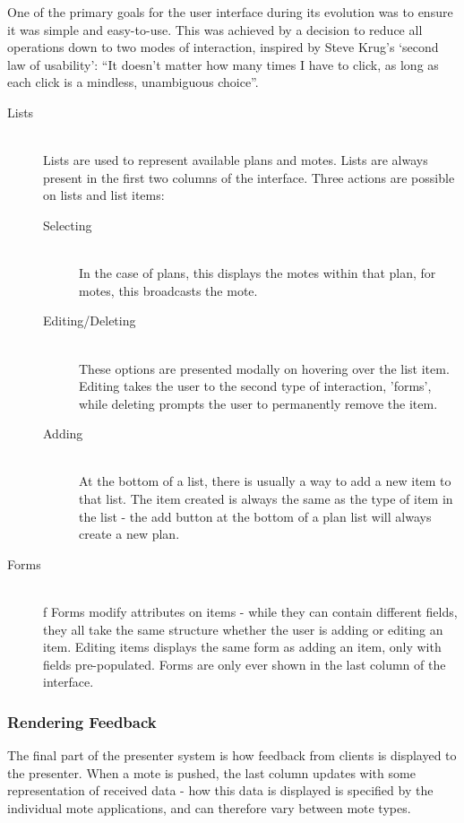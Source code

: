 \documentclass[a4papert,11pt,notitlepage]{article}
\begin{document}
One of the primary goals for the user interface during its evolution was to ensure it was simple and easy-to-use. This was achieved by a decision to reduce all operations down to two modes of interaction, inspired by Steve Krug's `second law of usability': ``It doesn't matter how many times I have to click, as long as each click is a mindless, unambiguous choice''\cite{krug:dontmakemethink}.
\begin{description}
\item[Lists] \hfill \\
Lists are used to represent available plans and motes. Lists are always present in the first two columns of the interface. Three actions are possible on lists and list items:
\begin{description}
\item[Selecting] \hfill \\
In the case of plans, this displays the motes within that plan, for motes, this broadcasts the mote.
\item[Editing/Deleting] \hfill \\
These options are presented modally on hovering over the list item. Editing takes the user to the second type of interaction, 'forms', while deleting prompts the user to permanently remove the item.
\item[Adding] \hfill \\
At the bottom of a list, there is usually a way to add a new item to that list. The item created is always the same as the type of item in the list - the add button at the bottom of a plan list will always create a new plan.
\end{description}
\item[Forms] \hfill \\f
Forms modify attributes on items - while they can contain different fields, they all take the same structure whether the user is adding or editing an item. Editing items displays the same form as adding an item, only with fields pre-populated. Forms are only ever shown in the last column of the interface.
\end{description}

\subsubsection{Rendering Feedback}
The final part of the presenter system is how feedback from clients is displayed to the presenter. When a mote is pushed, the last column updates with some representation of received data - how this data is displayed is specified by the individual mote applications, and can therefore vary between mote types.
\end{document}
